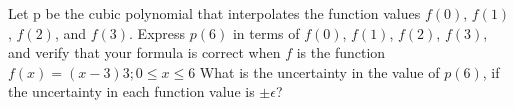 \begin{problem}
Let p be the cubic polynomial that interpolates the function values
$f(0)$, $f(1)$, $f(2)$, and $f(3)$. Express $p(6)$ in terms of $f(0)$,
$f(1)$, $f(2)$, $f(3)$, and verify that your formula is correct when
$f$ is the function ${f (x) = (x − 3) 3 ; 0 ≤ x ≤ 6}$ What is the
uncertainty in the value of $p(6)$, if the uncertainty in each function
value is $\pm \epsilon$?
\end{problem}


\begin{solution}  

\end{solution}

